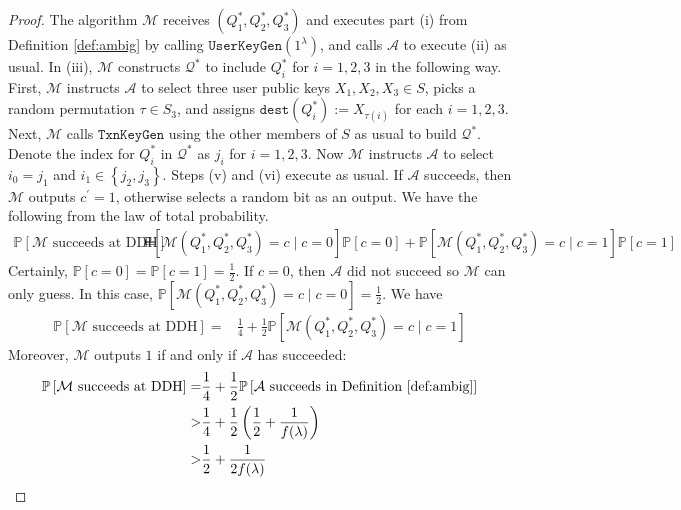 \documentclass{mrl}
\theoremstyle{definition}
\begin{document}
\begin{proof}
  The algorithm $\mathcal{M}$ receives $(Q_1^*, Q_2^*, Q_3^*)$ and executes part (i) from Definition \ref{def:ambig} by calling $\texttt{UserKeyGen}(1^{\lambda})$, and calls $\mathcal{A}$ to execute (ii) as usual. In (iii), $\mathcal{M}$ constructs $\mathcal{Q}^*$ to include $Q_i^*$ for $i=1,2,3$ in the following way. First, $\mathcal{M}$ instructs $\mathcal{A}$ to select three user public keys $X_1, X_2, X_3 \in S$, picks a random permutation $\tau \in S_3$, and assigns $\texttt{dest}(Q_i^*):=X_{\tau(i)}$ for each $i=1,2,3$. Next, $\mathcal{M}$ calls $\texttt{TxnKeyGen}$ using the other members of $S$ as usual to build $\mathcal{Q}^*$. Denote the index for $Q_i^*$ in $\mathcal{Q}^*$ as $j_i$ for $i=1,2,3$. Now $\mathcal{M}$ instructs $\mathcal{A}$ to select $i_0 = j_1$ and $i_1 \in \left\{j_2, j_3\right\}$. Steps (v) and (vi) execute as usual. If $\mathcal{A}$ succeeds, then $\mathcal{M}$ outputs $c^{\prime}=1$, otherwise selects a random bit as an output. We have the following from the law of total probability.
 \begin{align*}
 \mathbb{P}\left[\mathcal{M}\text{ succeeds at DDH}\right] =& \mathbb{P}\left[\mathcal{M}(Q^*_1, Q^*_2, Q^*_3)=c \mid c=0\right]\mathbb{P}\left[c=0\right] + \mathbb{P}\left[\mathcal{M}(Q^*_1, Q^*_2, Q^*_3)=c \mid c=1\right]\mathbb{P}\left[c=1\right]
 \end{align*}
 Certainly, $\mathbb{P}\left[c=0\right] = \mathbb{P}\left[c=1\right] = \frac{1}{2}$. If $c=0$, then $\mathcal{A}$ did not succeed so $\mathcal{M}$ can only guess. In this case,  $\mathbb{P}\left[\mathcal{M}(Q^*_1, Q^*_2, Q^*_3)=c \mid c=0\right] = \frac{1}{2}$. We have
 \begin{align*}
 \mathbb{P}\left[\mathcal{M}\text{ succeeds at DDH}\right] =& \frac{1}{4} + \frac{1}{2}\mathbb{P}\left[\mathcal{M}(Q^*_1, Q^*_2, Q^*_3)=c \mid c=1\right]
 \end{align*}
 Moreover, $\mathcal{M}$ outputs $1$ if and only if $\mathcal{A}$ has succeeded:
  \begin{align*}
 \mathbb{P}\left[\mathcal{M}\text{ succeeds at DDH}\right] =& \frac{1}{4} + \frac{1}{2}\mathbb{P}\left[\mathcal{A}\text{ succeeds in Definition \ref{def:ambig}}\right]\\
 >& \frac{1}{4} + \frac{1}{2}\left(\frac{1}{2} + \frac{1}{f(\lambda)}\right)\\
 >& \frac{1}{2} + \frac{1}{2f(\lambda)}
 \end{align*}
  
  
  \end{proof}
 
\end{document}
